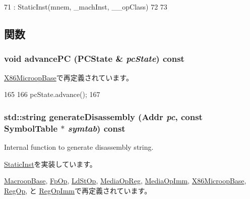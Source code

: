 \begin{DoxyCode}
71                 : StaticInst(mnem, _machInst, __opClass)
72             {
73             }
\end{DoxyCode}


\subsection{関数}
\hypertarget{classX86ISA_1_1X86StaticInst_af04cd01429462d48e635f3e01ced6257}{
\subsubsection[{advancePC}]{\setlength{\rightskip}{0pt plus 5cm}void advancePC ({\bf PCState} \& {\em pcState}) const}}
\label{classX86ISA_1_1X86StaticInst_af04cd01429462d48e635f3e01ced6257}


\hyperlink{classX86ISA_1_1X86MicroopBase_af04cd01429462d48e635f3e01ced6257}{X86MicroopBase}で再定義されています。


\begin{DoxyCode}
165         {
166             pcState.advance();
167         }
\end{DoxyCode}
\hypertarget{classX86ISA_1_1X86StaticInst_a95d323a22a5f07e14d6b4c9385a91896}{
\subsubsection[{generateDisassembly}]{\setlength{\rightskip}{0pt plus 5cm}std::string generateDisassembly ({\bf Addr} {\em pc}, \/  const {\bf SymbolTable} $\ast$ {\em symtab}) const}}
\label{classX86ISA_1_1X86StaticInst_a95d323a22a5f07e14d6b4c9385a91896}
Internal function to generate disassembly string. 

\hyperlink{classStaticInst_ab4a569d2623620c04f8a52bbd91d63b9}{StaticInst}を実装しています。

\hyperlink{classX86ISA_1_1MacroopBase_a95d323a22a5f07e14d6b4c9385a91896}{MacroopBase}, \hyperlink{classX86ISA_1_1FpOp_a95d323a22a5f07e14d6b4c9385a91896}{FpOp}, \hyperlink{classX86ISA_1_1LdStOp_a95d323a22a5f07e14d6b4c9385a91896}{LdStOp}, \hyperlink{classX86ISA_1_1MediaOpReg_a95d323a22a5f07e14d6b4c9385a91896}{MediaOpReg}, \hyperlink{classX86ISA_1_1MediaOpImm_a95d323a22a5f07e14d6b4c9385a91896}{MediaOpImm}, \hyperlink{classX86ISA_1_1X86MicroopBase_a95d323a22a5f07e14d6b4c9385a91896}{X86MicroopBase}, \hyperlink{classX86ISA_1_1RegOp_a95d323a22a5f07e14d6b4c9385a91896}{RegOp}, と \hyperlink{classX86ISA_1_1RegOpImm_a95d323a22a5f07e14d6b4c9385a91896}{RegOpImm}で再定義されています。


